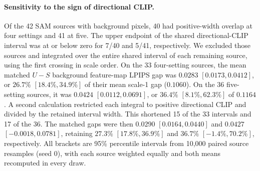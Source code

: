 \paragraph{Sensitivity to the sign of directional CLIP.}
Of the 42 SAM sources with background pixels, 40 had positive-width overlap at four settings and 41 at five. The upper endpoint of the shared directional-CLIP interval was at or below zero for 7/40 and 5/41, respectively. We excluded those sources and integrated over the entire shared interval of each remaining source, using the first crossing in scale order. On the 33 four-setting sources, the mean matched $U-S$ background feature-map LPIPS gap was $0.0283$ $[0.0173,0.0412]$, or $26.7\%$ $[18.4\%,34.9\%]$ of their mean scale-1 gap ($0.1060$). On the 36 five-setting sources, it was $0.0424$ $[0.0112,0.0691]$, or $36.4\%$ $[8.1\%,62.3\%]$ of $0.1164$. A second calculation restricted each integral to positive directional CLIP and divided by the retained interval width. This shortened 15 of the 33 intervals and 17 of the 36. The matched gaps were then $0.0290$ $[0.0164,0.0440]$ and $0.0427$ $[-0.0018,0.0781]$, retaining $27.3\%$ $[17.8\%,36.9\%]$ and $36.7\%$ $[-1.4\%,70.2\%]$, respectively. All brackets are 95\% percentile intervals from 10,000 paired source resamples (seed 0), with each source weighted equally and both means recomputed in every draw.

